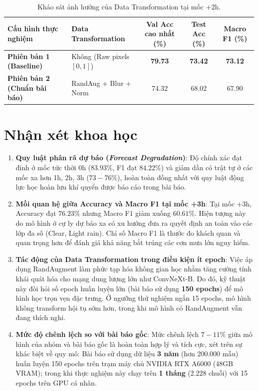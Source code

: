\documentclass[12pt,a4paper]{article}
\begin{document}
\begin{table}[H]
\centering
\caption{Khảo sát ảnh hưởng của Data Transformation tại mốc +2h.}
\vspace{0.2cm}
\begin{tabular}{llccc}
\toprule
\textbf{Cấu hình thực nghiệm} & \textbf{Data Transformation} & \textbf{Val Acc cao nhất (\%)} & \textbf{Test Acc (\%)} & \textbf{Macro F1 (\%)} \\
\midrule
\textbf{Phiên bản 1 (Baseline)}  & Không (Raw pixels $[0, 1]$) & \textbf{79.73} & \textbf{73.42} & \textbf{73.12} \\
\textbf{Phiên bản 2 (Chuẩn bài báo)} & RandAug + Blur + Norm       & 74.32          & 68.02          & 67.90          \\
\bottomrule
\end{tabular}
\end{table}

\vspace{0.2cm}
\section{Nhận xét khoa học}
\begin{enumerate}
    \item \textbf{Quy luật phân rã dự báo (\textit{Forecast Degradation})}: Độ chính xác đạt đỉnh ở mốc tức thời 0h ($83.93\%$, F1 đạt $84.22\%$) và giảm dần có trật tự ở các mốc xa hơn 1h, 2h, 3h ($73 - 76\%$), hoàn toàn đồng nhất với quy luật động lực học hoàn lưu khí quyển được báo cáo trong bài báo.
    \item \textbf{Mối quan hệ giữa Accuracy và Macro F1 tại mốc +3h}: Tại mốc +3h, Accuracy đạt $76.23\%$ nhưng Macro F1 giảm xuống $60.61\%$. Hiện tượng này do mô hình ở cự ly dự báo xa có xu hướng đưa ra quyết định an toàn vào các lớp đa số (Clear, Light rain). Chỉ số Macro F1 là thước đo khách quan và quan trọng hơn để đánh giá khả năng bắt trúng các cơn mưa lớn nguy hiểm.
    \item \textbf{Tác động của Data Transformation trong điều kiện ít epoch}: Việc áp dụng RandAugment làm phức tạp hóa không gian học nhằm tăng cường tính khái quát hóa cho mạng dung lượng lớn như ConvNeXt-B. Do đó, kỹ thuật này đòi hỏi số epoch huấn luyện lớn (bài báo sử dụng \textbf{150 epochs}) để mô hình học trọn vẹn đặc trưng. Ở ngưỡng thử nghiệm ngắn 15 epochs, mô hình không transform hội tụ sớm hơn, trong khi mô hình có RandAugment vẫn đang thích nghi.
    \item \textbf{Mức độ chênh lệch so với bài báo gốc}: Mức chênh lệch $7 - 11\%$ giữa mô hình của nhóm và bài báo gốc là hoàn toàn hợp lý và tích cực, xét trên sự khác biệt về quy mô: Bài báo sử dụng dữ liệu \textbf{3 năm} (hơn 200.000 mẫu) huấn luyện 150 epochs trên trạm máy chủ NVIDIA RTX A6000 (48GB VRAM); trong khi thực nghiệm này chạy trên \textbf{1 tháng} (2.228 chuỗi) với 15 epochs trên GPU cá nhân.
\end{enumerate}
\end{document}
